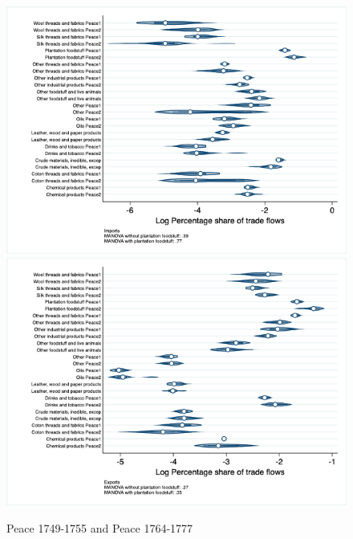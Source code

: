 \documentclass[12pt,a4paper,notitlepage,english]{article}
\begin{document}
\begin{appendix}
\begin{figure}[h!]
\centering
\caption{Peace 1749-1755 and Peace 1764-1777}
\label{seven_peace1764_1777_nat_distr_sitc}
\includegraphics[scale=.4]{peace1749_1755_peace1764_1777_nat_distr_Isitc}
\includegraphics[scale=.4]{peace1749_1755_peace1764_1777_nat_distr_Xsitc}
\end{figure}


\end{appendix}
\end{document}
